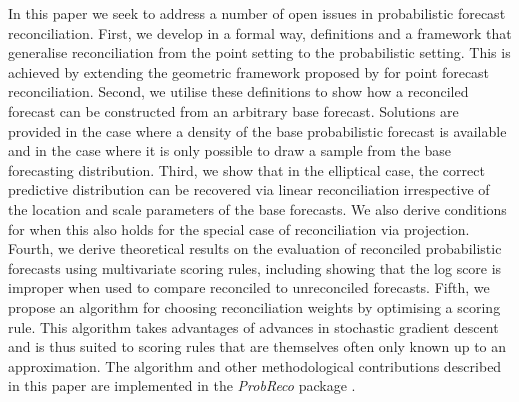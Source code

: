 \documentclass[11pt]{article}
\theoremstyle{definition}
\begin{document}
In this paper we seek to address a number of open issues in probabilistic forecast reconciliation. First, we develop in a formal way, definitions and a framework that generalise reconciliation from the point setting to the probabilistic setting. This is achieved by extending the geometric framework proposed by \cite{PanEtAl2020_Geometry} for point forecast reconciliation. Second, we utilise these definitions to show how a reconciled forecast can be constructed from an arbitrary base forecast. Solutions are provided in the case where a density of the base probabilistic forecast is available and in the case where it is only possible to draw a sample from the base forecasting distribution. Third, we show that in the elliptical case, the correct predictive distribution can be recovered via linear reconciliation irrespective of the location and scale parameters of the base forecasts. We also derive conditions for when this also holds for the special case of reconciliation via projection. Fourth, we derive theoretical results on the evaluation of reconciled probabilistic forecasts using multivariate scoring rules, including showing that the log score is improper when used to compare reconciled to unreconciled forecasts. Fifth, we propose an algorithm for choosing reconciliation weights by optimising a scoring rule. This algorithm takes advantages of advances in stochastic gradient descent and is thus suited to scoring rules that are themselves often only known up to an approximation. The algorithm and other methodological contributions described in this paper are implemented in the \emph{ProbReco} package \citep{RProbReco}.



\end{document}
